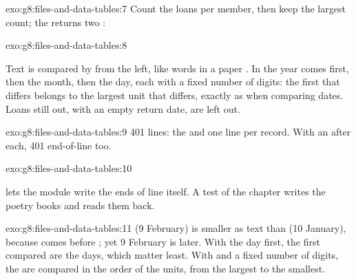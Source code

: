 \begin{solution}{exo:g8:files-and-data-tables:7}
Count the loans per member, then keep the largest count; the  returns
two :

\label{lst:g8:files-and-data-tables:sol-most-loans}
\end{solution}

\begin{solution}{exo:g8:files-and-data-tables:8}
\label{lst:g8:files-and-data-tables:sol-late}

Text is compared  by  from the left, like words in a paper
. In  the year comes first, then the month, then
the day, each with a fixed number of digits: the first  that
differs belongs to the largest unit that differs, exactly as when comparing
dates. Loans still out, with an empty return date, are left out.
\end{solution}

\begin{solution}{exo:g8:files-and-data-tables:9}
401 lines: the  and one line per record. With an  after
each, 401 end-of-line  too.
\end{solution}

\begin{solution}{exo:g8:files-and-data-tables:10}
\label{lst:g8:files-and-data-tables:sol-write}

 lets the  module write the ends of line itself.
A test of the chapter writes the poetry books and reads them back.
\end{solution}

\begin{solution}{exo:g8:files-and-data-tables:11}
 (9 February) is smaller as text than
 (10 January), because  comes before ;
yet 9 February is later. With the day first, the first  compared
are the days, which matter least. With  and a fixed number of
digits, the  are compared in the order of the units, from the
largest to the smallest.
\end{solution}


